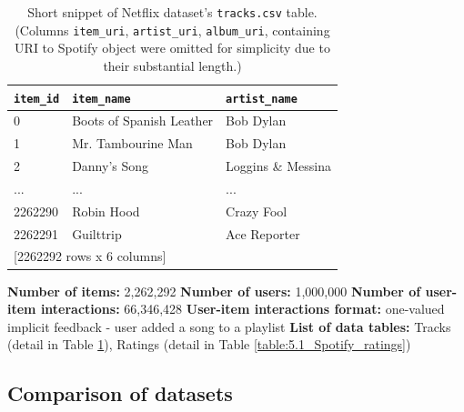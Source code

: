 \begin{table}[!ht]
    \centering
    \begin{tabular}{ l l l }
        \verb|item_id| & \verb|item_name| & \verb|artist_name|  \\
        \hline
             0 & Boots of Spanish Leather &         Bob Dylan \\
             1 &       Mr. Tambourine Man &         Bob Dylan \\
             2 &             Danny's Song & Loggins \& Messina \\ 
           ... &                      ... &               ... \\
       2262290 &               Robin Hood &        Crazy Fool \\
       2262291 &                Guilttrip &      Ace Reporter \\ [1mm]
       \multicolumn{3}{l}{{[2262292 rows x 6 columns]}}
    \end{tabular}
    \caption[Short snippet of Netflix dataset's \texttt{tracks.csv} table.]{Short snippet of Netflix dataset's \texttt{tracks.csv} table. (Columns \texttt{item\_uri}, \texttt{artist\_uri}, \texttt{album\_uri}, containing URI to Spotify object were omitted for simplicity due to their substantial length.)}
    \label{table:5.1_Spotify_tracks}
\end{table}

\hfill \break
\noindent
\textbf{Number of items:} 2,262,292 \newline
\textbf{Number of users:} 1,000,000 \newline
\textbf{Number of user-item interactions:} 66,346,428 \newline
\textbf{User-item interactions format:} one-valued implicit feedback - user added a song to a playlist\newline
\textbf{List of data tables:} Tracks (detail in Table \ref{table:5.1_Spotify_tracks}), Ratings (detail in Table \ref{table:5.1_Spotify_ratings})




\subsection{Comparison of datasets}


